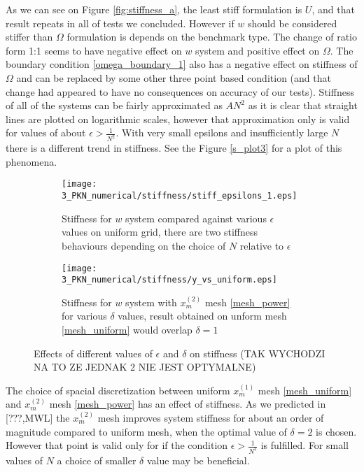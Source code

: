 As we can see on Figure \ref{fig:stiffness_a}, the least stiff formulation is $U$, and that result repeats in all of tests we concluded. However if $w$ should be considered stiffer than $\Omega$ formulation is depends on the benchmark type. The change of ratio form 1:1 seems to have negative effect on $w$ system and positive effect on $\Omega$. The boundary condition \eqref{omega_boundary_1} also has a negative effect on stiffness of $\Omega$ and can be replaced by  some other three point based condition (and that change had appeared to have no consequences on accuracy of our tests).  Stiffness of all of the systems can be fairly approximated as $AN^2$ as it is clear that straight lines are plotted on logarithmic scales, however that approximation only is valid for values of about $\epsilon>\frac{1}{N^2}$. With very small epsilons and insufficiently large $N$ there is a different trend in stiffness. See the Figure \ref{s_plot3} for a plot of this phenomena.

\begin{figure}
\centering
        \begin{subfigure}[b]{0.48\textwidth}
                \centering
                \texttt{[image: 3\_PKN\_numerical/stiffness/stiff\_epsilons\_1.eps]}
                \caption{Stiffness for $w$ system compared against various $\epsilon$ values on uniform grid, there are two stiffness behaviours depending on the choice of $N$ relative to $\epsilon$}
                \label{s_plot5}
        \end{subfigure}
        \begin{subfigure}[b]{0.48\textwidth}
                \centering
                \texttt{[image: 3\_PKN\_numerical/stiffness/y\_vs\_uniform.eps]}
                \caption{Stiffness for $w$ system with  $x^{(2)}_m$ mesh \eqref{mesh_power} for various $\delta$ values, result obtained on unform mesh \eqref{mesh_uniform} would overlap $\delta=1$}
                \label{s_plot6}
        \end{subfigure}
\caption{Effects of different values of $\epsilon$ and $\delta$ on stiffness (TAK WYCHODZI NA TO ZE JEDNAK 2 NIE JEST OPTYMALNE) }
\label{fig:stiffness_b}
\end{figure}

The choice of spacial discretization between uniform  $x^{(1)}_m$  mesh \eqref{mesh_uniform} and $x^{(2)}_m$  mesh \eqref{mesh_power} has an effect of stiffness. As we predicted in [???,MWL] the $x^{(2)}_m$  mesh improves system stiffness for about an order of magnitude compared to uniform mesh, when the optimal value of $\delta=2$ is chosen. However that point is valid only for if the condition $\epsilon>\frac{1}{N^2}$ is fulfilled. For small values of $N$ a choice of smaller $\delta$ value may be beneficial.

